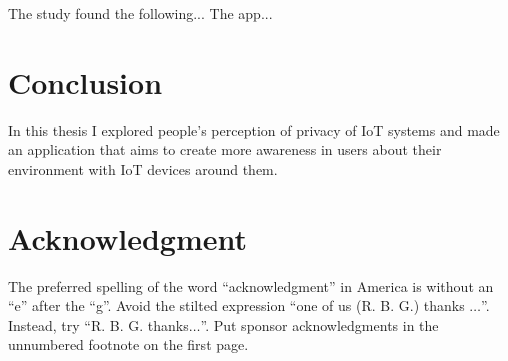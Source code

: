 \documentclass[conference]{IEEEtran}
\begin{document}
The study found the following... The app...

\section{Conclusion}

In this thesis I explored people's perception of privacy of IoT systems and
made an application that aims to create more awareness in users about their
environment with IoT devices around them.

\section*{Acknowledgment}

The preferred spelling of the word ``acknowledgment'' in America is without
an ``e'' after the ``g''. Avoid the stilted expression ``one of us (R. B.
G.) thanks $\ldots$''. Instead, try ``R. B. G. thanks$\ldots$''. Put sponsor
acknowledgments in the unnumbered footnote on the first page.



\end{document}
